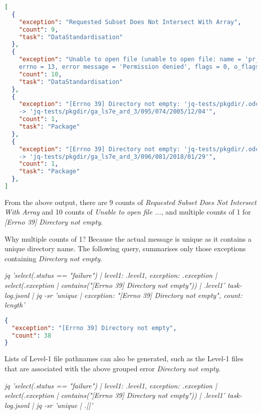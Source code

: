 \documentclass[a4paper,oneside,titlepage]{article}
\begin{document}
    \begin{lstlisting}[basicstyle=\tiny, language=json]
[
  {
    "exception": "Requested Subset Does Not Intersect With Array",
    "count": 9,
    "task": "DataStandardisation"
  },
  {
    "exception": "Unable to open file (unable to open file: name = 'pr_wtr.eatm.2020.h5',
    errno = 13, error message = 'Permission denied', flags = 0, o_flags = 0)",
    "count": 10,
    "task": "DataStandardisation"
  },
  {
    "exception": "[Errno 39] Directory not empty: 'jq-tests/pkgdir/.odcdataset-04io7y6f'
    -> 'jq-tests/pkgdir/ga_ls7e_ard_3/095/074/2005/12/04'",
    "count": 1,
    "task": "Package"
  },
  {
    "exception": "[Errno 39] Directory not empty: 'jq-tests/pkgdir/.odcdataset-09alscsi'
    -> 'jq-tests/pkgdir/ga_ls7e_ard_3/096/081/2018/01/29'",
    "count": 1,
    "task": "Package"
  },
]
    \end{lstlisting}

    \begin{flushleft}
      From the above output, there are 9 counts of \textit{Requested Subset Does Not Intersect With Array} and 10 counts of \textit{Unable to open file ...}, and multiple counts of 1 for \textit{[Errno 39] Directory not empty}. \par
      Why multiple counts of 1? Because the actual message is unique as it contains a unique directory name.
      The following query, summarises only those exceptions containing \textit{Directory not empty}. \par
      \textit{{\tiny jq 'select(.status == "failure") |
      {level1: .level1, exception: .exception} |
      select(.exception | contains("[Errno 39] Directory not empty")) |
      .level1' task-log.jsonl | jq -sr 'unique |
      {exception: "[Errno 39] Directory not empty", count: length}'}}
    \end{flushleft}

    \begin{lstlisting}[basicstyle=\tiny, language=json]
{
  "exception": "[Errno 39] Directory not empty",
  "count": 38
}
    \end{lstlisting}

    \begin{flushleft}
      Lists of Level-1 file pathnames can also be generated, such as the Level-1 files that are associated with the above grouped error \textit{Directory not empty}. \par
      \textit{{\tiny jq 'select(.status == "failure") |
      {level1: .level1, exception: .exception} |
      select(.exception | contains("[Errno 39] Directory not empty")) |
      .level1' task-log.jsonl | jq -sr 'unique | .[]'}}
    \end{flushleft}
\end{document}
